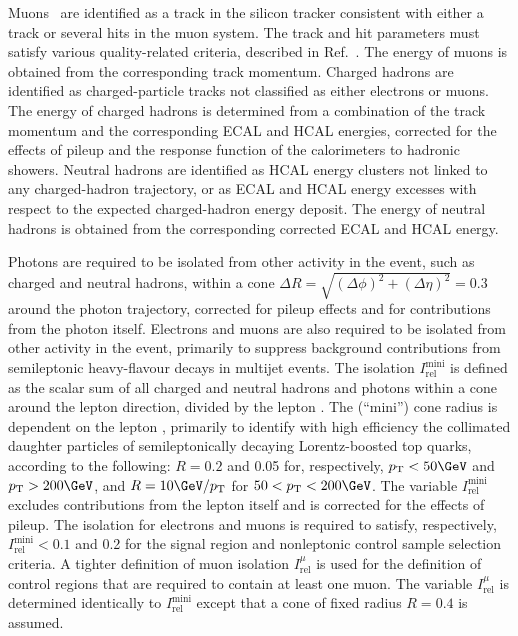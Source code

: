 Muons~\cite{Chatrchyan:2012xi} are identified as a track in the
silicon tracker consistent with either a track or several hits in the
muon system. The track and hit parameters must satisfy various
quality-related criteria, described in Ref.~\cite{Chatrchyan:2012xi}. 
The energy of muons is obtained from the corresponding track momentum.
Charged hadrons are identified as charged-particle tracks not
classified as either electrons or muons.
The energy of charged hadrons is determined from a combination of the
track momentum and the corresponding ECAL and HCAL energies, corrected
for the effects of pileup and the response function of the
calorimeters to hadronic showers. Neutral hadrons are identified as
HCAL energy clusters not linked to any charged-hadron trajectory, or
as ECAL and HCAL energy excesses with respect to the expected
charged-hadron energy deposit.  The energy of neutral hadrons is
obtained from the corresponding corrected ECAL and HCAL energy.

Photons are required to be isolated from other activity in the event,
such as charged and neutral hadrons, within a cone $\Delta R =
\sqrt{(\Delta\phi)^2 + (\Delta\eta)^2} = 0.3$ around the photon
trajectory, corrected for pileup effects and for contributions from
the photon itself. Electrons and muons are also required to be
isolated from other activity in the event, primarily to suppress
background contributions from semileptonic heavy-flavour decays in
multijet events. The isolation $I^\text{mini}_\text{rel}$ is defined
as the scalar \Pt sum of all charged and neutral hadrons and photons
within a cone around the lepton direction, divided by the lepton
\Pt. The (``mini'') cone radius is dependent on the lepton \Pt,
primarily to identify with high efficiency the collimated daughter
particles of semileptonically decaying Lorentz-boosted top quarks,
according to the following: $R = 0.2$ and 0.05 for, respectively, $\Pt
< 50\GeV$ and $\Pt > 200\GeV$, and $R = 10\GeV / \Pt$ for $50 < \Pt <
200\GeV$. The variable $I^\text{mini}_\text{rel}$ excludes
contributions from the lepton itself and is corrected for the effects
of pileup. The isolation for electrons and muons is required to
satisfy, respectively, $I^\text{mini}_\text{rel} < 0.1$ and 0.2 for
the signal region and nonleptonic control sample selection criteria.
A tighter definition of muon isolation $I^{\mu}_\text{rel}$ is used
for the definition of control regions that are required to contain at
least one muon. The variable $I^{\mu}_\text{rel}$ is determined
identically to $I^\text{mini}_\text{rel}$ except that a cone of fixed
radius $R = 0.4$ is assumed.


